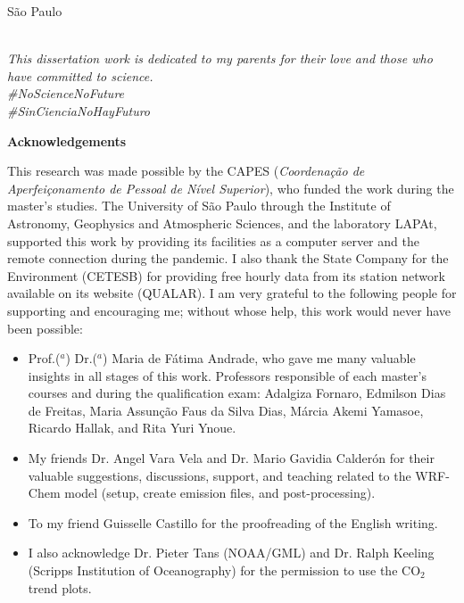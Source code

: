 \begin{spacing}{1.5}
\begin{titlepage}
			\vfill
	\begin{center}
				S\~{a}o Paulo \\
			\the\year \\
	\end{center}
	\end{titlepage}		

	\newpage
	\thispagestyle{empty}
	\vspace*{\fill} \hfill\begin{minipage}{0.5\linewidth}
	\begin{flushright}
	\textit{This dissertation work is dedicated to my parents for their love and those who have committed to science.  \\
	\#NoScienceNoFuture\\
	\#SinCienciaNoHayFuturo \\
	 }
	\end{flushright}
		\end{minipage}
	\pagestyle{empty}
	
	\newpage
		\begin{center}
			\LARGE \textbf{Acknowledgements}\\[2cm]
		\end{center}
		
		This research was made possible by the CAPES (\textit{Coordena\c{c}\~{a}o de Aperfei\c{c}onamento de Pessoal de N\'{i}vel Superior}), who funded the work during the master's studies.
		The University of S\~{a}o Paulo through the Institute of Astronomy, Geophysics and Atmospheric Sciences, and the laboratory LAPAt, supported this work by providing its facilities as a computer server and the remote connection during the pandemic.
		I also thank the State Company for the Environment (CETESB) for providing free hourly data from its station network available on its website (QUALAR).
		I am very grateful to the following people for supporting and encouraging me; without whose help, this work would never have been possible:
		\begin{itemize}
		    \item Prof.($^a$) Dr.($^a$) Maria de F\'{a}tima Andrade, who gave me many valuable insights in all stages of this work.
		    Professors responsible of each master's courses and during the qualification exam: Adalgiza Fornaro, Edmilson Dias de Freitas, Maria Assun\c{c}\~{a}o Faus da Silva Dias, M\'{a}rcia Akemi Yamasoe, Ricardo Hallak, and Rita Yuri Ynoue.
		   \item  My friends Dr. Angel Vara Vela and Dr. Mario Gavidia Calder\'{o}n for their valuable suggestions, discussions, support, and teaching related to the WRF-Chem model (setup, create emission files, and post-processing).
		   \item To my friend Guisselle Castillo for the proofreading of the English writing.
		   \item I also acknowledge Dr. Pieter Tans (NOAA/GML) and Dr. Ralph Keeling (Scripps Institution of Oceanography) for the permission to use the CO$_2$ trend plots.
		\end{itemize}
		

\end{spacing}
